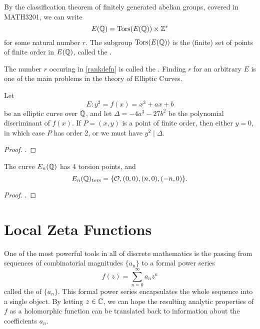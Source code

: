 \documentclass[12pt, a4paper]{report}
\begin{document}
By the classification theorem of finitely generated abelian groups, covered in
MATH3201, we can write
\begin{equation} \label{rankdefn}
E({\mathbb Q}) = {\text{\normalfont Tors}}(E({\mathbb Q})) \times {\mathbb Z}^r
\end{equation}
for some natural number $r$. The subgroup ${\text{\normalfont Tors}}(E({\mathbb Q}))$ is the (finite) set of
points of finite order in $E({\mathbb Q})$, called the .

\begin{defn}
  The number $r$ occuring in \autoref{rankdefn} is called the
  . Finding $r$ for an arbitrary $E$ is one of the main
  problems in the theory of Elliptic Curves.
\end{defn}

\begin{thm} \label{thm:nagelllutz}
  Let
  \[E: y^2 = f(x) = x^3 + ax + b\]
  be an elliptic curve over ${\mathbb Q}$, and let $\Delta = -4a^3 -27b^2$ be the
  polynomial discriminant of $f(x)$. If $P = (x,y)$ is a point of finite order,
  then either $y = 0$, in which case $P$ has order 2, or we must have $y^2 \mid \Delta$.
\end{thm}
\begin{proof}
  \cite[See][Chapter II, pages 49-56]{rational}.
\end{proof}

\begin{prop}
  The curve $E_n({\mathbb Q})$ has 4 torsion points, and
  \[E_n({\mathbb Q})_{\textnormal{tors}} = \{{\mathcal O}, (0,0), (n,0), (-n,0)\}.\]
\end{prop}

\begin{proof}
  \cite[See][Chapter I-9, pages 44-45]{koblitz}.
\end{proof}

\section{Local Zeta Functions}

One of the most powerful tools in all of discrete mathematics is the passing
from sequences of combinatorial magnitudes $\{a_n\}$ to a formal power series
\[f(z) = \sum\limits_{n=0}^\infty a_nz^n\]
called the  of $\{a_n\}.$ This formal power series
encapsulates the whole sequence into a single object. By letting $z \in {\mathbb C}$,
we can hope the
resulting analytic properties of $f$ as a holomorphic function can be translated
back to information about the coefficients $a_n$.
\end{document}

